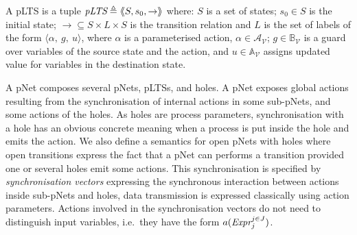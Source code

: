 \documentclass{llncs}
\newcommand{\Simon}{\\\hfill\mdash Simon}
\newcommand{\noteSB}[2][color=green!40, size=\tiny]{\todo[#1]{{#2}\Simon}}
\newcommand{\Ludo}{\\\hfill\mdash Ludo}
\newcommand{\noteLH}[2][color=orange!40, size=\tiny]{\todo[#1]{{#2}\Ludo}}
\newcommand{\newCoord}[1]{{\color{blue}#1}}
\newcommand{\cA}{\ensuremath{\mathcal{A}}}
\newcommand{\sA}{\ensuremath{\mathbb{A}}}
\newcommand{\sB}{\ensuremath{\mathbb{B}}}
\newcommand{\cV}{\ensuremath{\mathcal{V}}}
\newcommand{\mdash}[1][]{---#1}
\newcommand{\ie}[1][\ ]{i.e.#1}
\newcommand{\variables}{\ensuremath{\cV}}
\newcommand{\actions}[1]{\ensuremath{\cA_{#1}}}
\newcommand{\boolexprs}[1]{\ensuremath{\sB_{#1}}}
\newcommand{\assigns}[1]{\ensuremath{\sA_{#1}}}
\begin{document}
\begin{definition}[pLTS]
\label{pLTS}
A pLTS is a tuple
$\pLTS\triangleq\mylangle S,s_0, \to\myrangle$ where:
$S$ is a set of states; %
$s_0 \in S$ is the initial state;
$\to \subseteq S \times L \times S$ is the transition relation and 
$L$ is the set of labels of the form
$\langle \alpha,~g,~u\rangle$,
where $\alpha$ is a parameterised action, $\alpha \in\actions{\variables}$; 
$g\in\boolexprs{\variables}$ is a guard over variables of the source state and the 
action, and $u\in\assigns{\variables}$
assigns updated value for variables in the destination state. 
\end{definition}
A pNet composes several pNets, pLTSs, and holes.
A  pNet  exposes
 global actions resulting from the synchronisation of internal actions in some sub-pNets, and some actions of the holes. \newCoord{As holes are process parameters, synchronisation with a hole has an obvious concrete meaning when a process is put inside the hole and emits the action. We  also define a semantics for open pNets with holes where open transitions express the fact that a pNet can performs a transition provided one or several holes emit some actions.}
\newCoord{This synchronisation  is specified by  \emph{synchronisation vectors} expressing the synchronous interaction between actions inside sub-pNets and holes, data transmission is expressed classically using action parameters.}
Actions involved in the synchronisation vectors do
not need to distinguish input variables, \ie they 
have the form $a(\Expr_j^{j \in J})$.
\end{document}
